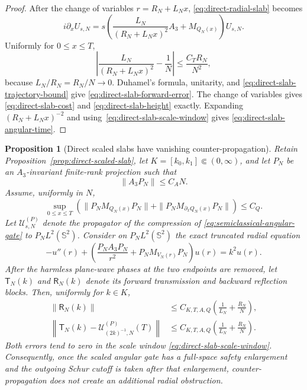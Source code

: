 \documentclass[11pt]{article}
\newtheorem{proposition}[theorem]{Proposition}
\theoremstyle{remark}
\begin{document}
\begin{proof}
After the change of variables $r=R_N+L_Nx$,
\eqref{eq:direct-radial-slab} becomes
\[
 i\partial_xU_{s,N}
 =
 s\left(
  \frac{L_N}{(R_N+L_Nx)^2}A_3+M_{Q_N(x)}
 \right)U_{s,N}.
\]
Uniformly for $0\leq x\leq T$,
\[
 \left|
 \frac{L_N}{(R_N+L_Nx)^2}-\frac1N
 \right|
 \leq
 \frac{C_T R_N}{N^2},
\]
because $L_N/R_N=R_N/N\to0$.  Duhamel's formula, unitarity, and
\eqref{eq:direct-slab-trajectory-bound} give
\eqref{eq:direct-slab-forward-error}.  The change of variables gives
\eqref{eq:direct-slab-cost} and
\eqref{eq:direct-slab-height} exactly.  Expanding
$(R_N+L_Nx)^{-2}$ and using~\eqref{eq:direct-slab-scale-window} gives
\eqref{eq:direct-slab-angular-time}.
\end{proof}

\begin{proposition}[Direct scaled slabs have vanishing counter-propagation]
\label{prop:direct-scaled-slab-backscatter}
Retain Proposition~\ref{prop:direct-scaled-slab}, let
$K=[k_0,k_1]\Subset(0,\infty)$, and let $P_N$ be an $A_3$-invariant
finite-rank projection such that
\begin{equation}
 \|A_3P_N\|\leq C_AN.
 \label{eq:direct-slab-active-energy}
\end{equation}
Assume, uniformly in $N$,
\begin{equation}
 \sup_{0\leq x\leq T}
 \left(
  \|P_NM_{Q_N(x)}P_N\|
  +
  \|P_NM_{\partial_xQ_N(x)}P_N\|
 \right)
 \leq C_Q.
 \label{eq:direct-slab-radial-regularity}
\end{equation}
Let $\mathcal U^{(P)}_{s,N}$ denote the propagator of the compression of
\eqref{eq:semiclassical-angular-gate} to $P_NL^2(\mathbb S^2)$.
Consider on $P_NL^2(\mathbb S^2)$ the exact truncated radial equation
\begin{equation}
 -u''(r)+
 \left(
  \frac{P_NA_3P_N}{r^2}+P_NM_{V_N(r)}P_N
 \right)u(r)
 =
 k^2u(r).
 \label{eq:direct-slab-second-order-radial}
\end{equation}
After the harmless plane-wave phases at the two endpoints are removed, let
$\mathsf T_N(k)$ and $\mathsf R_N(k)$ denote its forward transmission and
backward reflection blocks.  Then, uniformly for $k\in K$,
\begin{align}
 \|\mathsf R_N(k)\|
 &\leq
 C_{K,T,A,Q}
 \left(\frac1{L_N}+\frac{R_N}{N}\right),
 \label{eq:direct-slab-backscatter-bound}\\
 \left\|
 \mathsf T_N(k)
 -
 \mathcal U^{(P)}_{(2k)^{-1},N}(T)
 \right\|
 &\leq
 C_{K,T,A,Q}
 \left(\frac1{L_N}+\frac{R_N}{N}\right).
 \label{eq:direct-slab-transmission-bound}
\end{align}
Both errors tend to zero in the scale window
\eqref{eq:direct-slab-scale-window}.  Consequently, once the scaled angular
gate has a full-space safety enlargement and the outgoing Schur cutoff is
taken after that enlargement, counter-propagation does not create an
additional radial obstruction.
\end{proposition}
\end{document}
